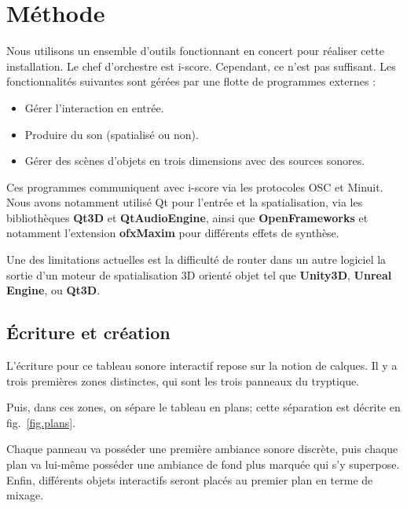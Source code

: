 \documentclass[french]{article}
\begin{document}
    \section*{Méthode}
    Nous utilisons un ensemble d'outils fonctionnant en concert pour réaliser cette installation.
    Le chef d'orchestre est i-score.
    Cependant, ce n'est pas suffisant.
    Les fonctionnalités suivantes sont gérées par une flotte de programmes externes : 
    \begin{itemize}
        \item Gérer l'interaction en entrée.
        \item Produire du son (spatialisé ou non).
        \item Gérer des scènes d'objets en trois dimensions avec des sources sonores.
    \end{itemize}
    
    Ces programmes communiquent avec i-score via les protocoles OSC et Minuit.
    Nous avons notamment utilisé Qt pour l'entrée et la spatialisation, via les bibliothèques \textbf{Qt3D} et \textbf{QtAudioEngine}, ainsi que \textbf{OpenFrameworks} et notamment l'extension \textbf{ofxMaxim} pour différents effets de synthèse.
    
    Une des limitations actuelles est la difficulté de router dans un autre logiciel la sortie d'un moteur de spatialisation 3D orienté objet tel que \textbf{Unity3D}, \textbf{Unreal Engine}, ou \textbf{Qt3D}.
    
    
    
    \subsection*{Écriture et création}
    L'écriture pour ce tableau sonore interactif repose sur la notion de calques.
    Il y a trois premières zones distinctes, qui sont les trois panneaux du tryptique.
    
    Puis, dans ces zones, on sépare le tableau en plans; cette séparation est décrite en fig.~\ref{fig.plans}.
    
    Chaque panneau va posséder une première ambiance sonore discrète, puis chaque plan va lui-même 
    posséder une ambiance de fond plus marquée qui s'y superpose.
    Enfin, différents objets interactifs seront placés au premier plan en terme de mixage.
    
\end{document}
